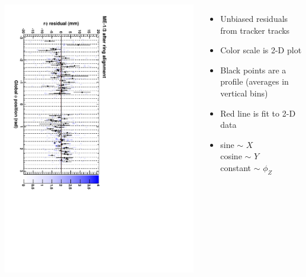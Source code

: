 \documentclass[compress]{beamer}
\begin{document}
\begin{frame}
\begin{columns}
\includegraphics[height=\linewidth, angle=90]{ringfits_after/mem13.pdf}
\begin{itemize}
\item Unbiased residuals from tracker tracks
\item Color scale is 2-D plot
\item Black points are a profile (averages in vertical bins)
\item Red line is fit to 2-D data
\item sine $\sim$ $X$ \\
cosine $\sim$ $Y$ \\
constant $\sim$ $\phi_Z$
\end{itemize}
\end{columns}
\end{frame}
\end{document}

